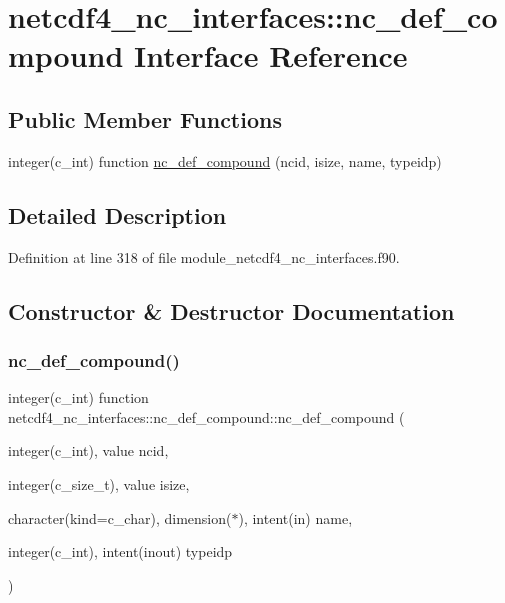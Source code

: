 \hypertarget{interfacenetcdf4__nc__interfaces_1_1nc__def__compound}{}\section{netcdf4\+\_\+nc\+\_\+interfaces\+:\+:nc\+\_\+def\+\_\+compound Interface Reference}
\label{interfacenetcdf4__nc__interfaces_1_1nc__def__compound}
\subsection*{Public Member Functions}
\begin{DoxyCompactItemize}
\item 
integer(c\+\_\+int) function \hyperlink{interfacenetcdf4__nc__interfaces_1_1nc__def__compound_a930aab5c80eb7937cfe650d66196858c}{nc\+\_\+def\+\_\+compound} (ncid, isize, name, typeidp)
\end{DoxyCompactItemize}


\subsection{Detailed Description}


Definition at line 318 of file module\+\_\+netcdf4\+\_\+nc\+\_\+interfaces.\+f90.



\subsection{Constructor \& Destructor Documentation}
\mbox{\label{interfacenetcdf4__nc__interfaces_1_1nc__def__compound_a930aab5c80eb7937cfe650d66196858c}} 
\subsubsection{\texorpdfstring{nc\+\_\+def\+\_\+compound()}{nc\_def\_compound()}}
{\footnotesize\ttfamily integer(c\+\_\+int) function netcdf4\+\_\+nc\+\_\+interfaces\+::nc\+\_\+def\+\_\+compound\+::nc\+\_\+def\+\_\+compound (\begin{DoxyParamCaption}\item[{integer(c\+\_\+int), value}]{ncid,  }\item[{integer(c\+\_\+size\+\_\+t), value}]{isize,  }\item[{character(kind=c\+\_\+char), dimension($\ast$), intent(in)}]{name,  }\item[{integer(c\+\_\+int), intent(inout)}]{typeidp }\end{DoxyParamCaption})}



